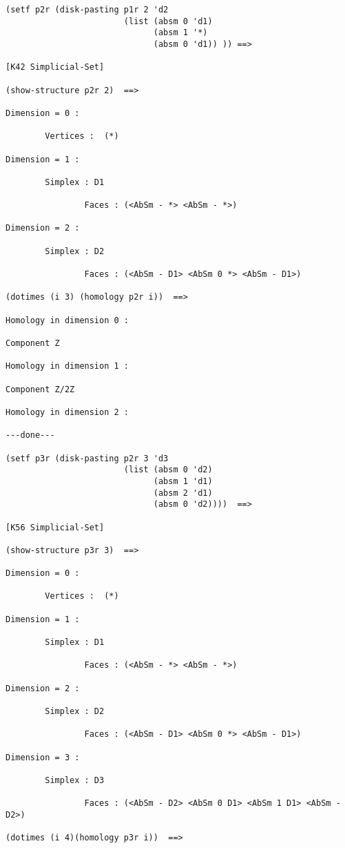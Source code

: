 {\footnotesize\begin{verbatim}
(setf p2r (disk-pasting p1r 2 'd2
                        (list (absm 0 'd1)
                              (absm 1 '*)
                              (absm 0 'd1)) )) ==>

[K42 Simplicial-Set]

(show-structure p2r 2)  ==>

Dimension = 0 :

        Vertices :  (*)

Dimension = 1 :

        Simplex : D1

                Faces : (<AbSm - *> <AbSm - *>)

Dimension = 2 :

        Simplex : D2

                Faces : (<AbSm - D1> <AbSm 0 *> <AbSm - D1>)

(dotimes (i 3) (homology p2r i))  ==>

Homology in dimension 0 :

Component Z

Homology in dimension 1 :

Component Z/2Z

Homology in dimension 2 :

---done---

(setf p3r (disk-pasting p2r 3 'd3
                        (list (absm 0 'd2)
                              (absm 1 'd1)
                              (absm 2 'd1)
                              (absm 0 'd2))))  ==>

[K56 Simplicial-Set]

(show-structure p3r 3)  ==>

Dimension = 0 :

        Vertices :  (*)

Dimension = 1 :

        Simplex : D1

                Faces : (<AbSm - *> <AbSm - *>)

Dimension = 2 :

        Simplex : D2

                Faces : (<AbSm - D1> <AbSm 0 *> <AbSm - D1>)

Dimension = 3 :

        Simplex : D3

                Faces : (<AbSm - D2> <AbSm 0 D1> <AbSm 1 D1> <AbSm - D2>)

(dotimes (i 4)(homology p3r i))  ==>


\end{verbatim}}
